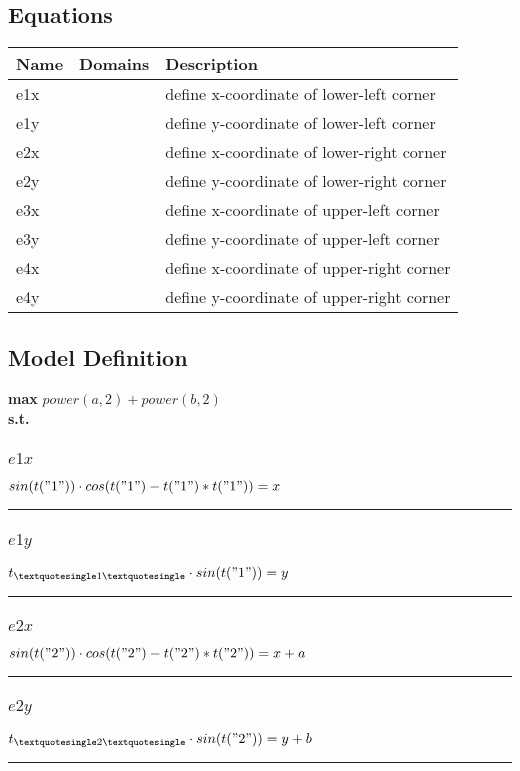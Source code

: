 \documentclass[11pt]{article}
\begin{document}
\subsection*{Equations}
\begin{tabularx}{\textwidth}{| l | l | X |}
\hline
\textbf{Name} & \textbf{Domains} & \textbf{Description}\\
\hline
\endhead

e1x &  & define x-coordinate of lower-left corner\\
e1y &  & define y-coordinate of lower-left corner\\
e2x &  & define x-coordinate of lower-right corner\\
e2y &  & define y-coordinate of lower-right corner\\
e3x &  & define x-coordinate of upper-left corner\\
e3y &  & define y-coordinate of upper-left corner\\
e4x &  & define x-coordinate of upper-right corner\\
e4y &  & define y-coordinate of upper-right corner\\
\hline
\end{tabularx}
\subsection*{Model Definition}
\textbf{max} $power(a,2) + power(b,2)$\\
\textbf{s.t.}
\subsubsection*{$e1x$}
$
sin(t("1")) \cdot cos(t("1") - t("1") * t("1")) = x
$
\vspace{5pt}
\hrule
\subsubsection*{$e1y$}
$
t_{\textquotesingle 1 \textquotesingle} \cdot sin(t("1")) = y
$
\vspace{5pt}
\hrule
\subsubsection*{$e2x$}
$
sin(t("2")) \cdot cos(t("2") - t("2") * t("2")) = x + a
$
\vspace{5pt}
\hrule
\subsubsection*{$e2y$}
$
t_{\textquotesingle 2 \textquotesingle} \cdot sin(t("2")) = y + b
$
\vspace{5pt}
\hrule
\end{document}
